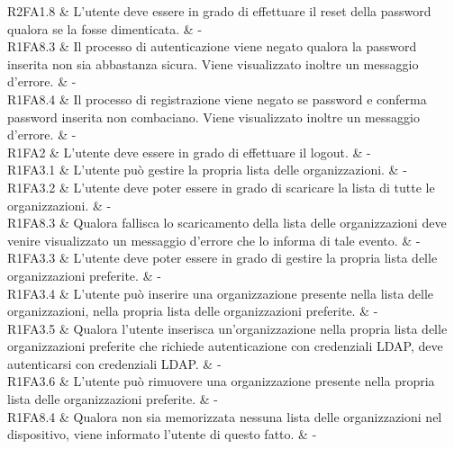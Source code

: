 R2FA1.8 & L'utente deve essere in grado di effettuare il reset della password qualora se la fosse dimenticata. & - \\

R1FA8.3 & Il processo di autenticazione viene negato qualora la password inserita non sia abbastanza sicura. Viene visualizzato inoltre un messaggio d'errore. & - \\

R1FA8.4 & Il processo di registrazione viene negato se password e conferma password inserita non combaciano. Viene visualizzato inoltre un messaggio d'errore. & - \\


R1FA2 & L'utente deve essere in grado di effettuare il logout. & - \\

R1FA3.1 & L'utente può gestire la propria lista delle organizzazioni. & - \\

R1FA3.2 & L'utente deve poter essere in grado di scaricare la lista di tutte le organizzazioni.  & - \\

R1FA8.3 & Qualora fallisca lo scaricamento della lista delle organizzazioni deve venire visualizzato un messaggio d'errore che lo informa di tale evento. & - \\

R1FA3.3 & L’utente deve poter essere in grado di gestire la propria lista delle organizzazioni preferite. & - \\

R1FA3.4 & L’utente può inserire una organizzazione presente nella lista delle organizzazioni, nella propria lista delle organizzazioni preferite.  & - \\

R1FA3.5 & Qualora l’utente inserisca un'organizzazione nella propria lista delle organizzazioni preferite che richiede autenticazione con credenziali LDAP, deve autenticarsi con credenziali LDAP. & - \\

R1FA3.6 & L’utente può rimuovere una organizzazione presente nella propria lista delle organizzazioni preferite.  & - \\

R1FA8.4 & Qualora non sia memorizzata nessuna lista delle organizzazioni nel dispositivo, viene informato l’utente di questo fatto.  & - \\

